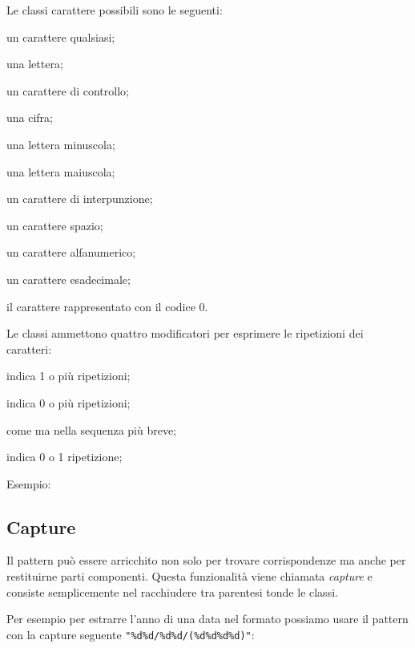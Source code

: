 Le classi carattere possibili sono le seguenti:
\begin{compactdescription}
  \item[\key{.}] un carattere qualsiasi;
  \item[\key{\%a}] una lettera;
  \item[\key{\%c}] un carattere di controllo;
  \item[\key{\%d}] una cifra;
  \item[\key{\%l}] una lettera minuscola;
  \item[\key{\%u}] una lettera maiuscola;
  \item[\key{\%p}] un carattere di interpunzione;
  \item[\key{\%s}] un carattere spazio;
  \item[\key{\%w}] un carattere alfanumerico;
  \item[\key{\%x}] un carattere esadecimale;
  \item[\key{\%z}] il carattere rappresentato con il codice 0.
\end{compactdescription}

Le classi ammettono quattro modificatori per esprimere le ripetizioni dei
caratteri:
\begin{compactdescription}
  \item[\key{+}] indica 1 o più ripetizioni;
  \item[\key{*}] indica 0 o più ripetizioni;
  \item[\key{-}] come \key{*} ma nella sequenza più breve;
  \item[\key{?}] indica 0 o 1 ripetizione;
\end{compactdescription}

Esempio:

\subsection{Capture}
\label{secFondCapture}

Il pattern può essere arricchito non solo per trovare corrispondenze ma anche
per restituirne parti componenti. Questa funzionalità viene chiamata
\emph{capture} e consiste semplicemente nel racchiudere tra parentesi tonde le
classi.

Per esempio per estrarre l'anno di una data nel formato 
possiamo usare il pattern con la capture seguente \verb|"%d%d/%d%d/(%d%d%d%d)"|:

